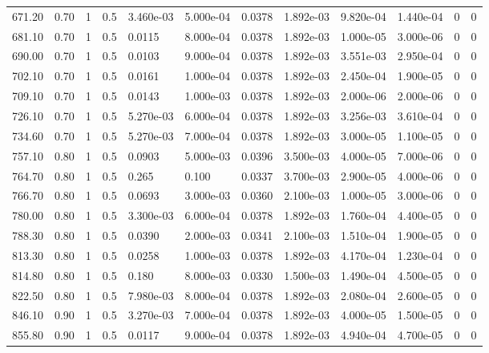 \documentclass[preview]{standalone}
\begin{document}
{{{\begin{tabular}{L{1.2cm}C{1.2cm} C{0.3cm}C{0.5cm} C{1.4cm}C{1.4cm} C{1.4cm}C{1.4cm} C{1.6cm}C{1.6cm} C{1.6cm}C{1.6cm}}
  671.20  &  0.70  & 1     & 0.5 &  3.460e-03  & 5.000e-04  &  0.0378&   1.892e-03& 9.820e-04 & 1.440e-04   &  0 & 0  \\ 
  681.10  &  0.70  & 1     & 0.5 &  0.0115  & 8.000e-04  &  0.0378&   1.892e-03& 1.000e-05 & 3.000e-06   &  0 & 0  \\ 
  690.00  &  0.70  & 1     & 0.5 &  0.0103  & 9.000e-04  &  0.0378&   1.892e-03& 3.551e-03 & 2.950e-04   &  0 & 0  \\ 
  702.10  &  0.70  & 1     & 0.5 &  0.0161  & 1.000e-04  &  0.0378&   1.892e-03& 2.450e-04 & 1.900e-05   &  0 & 0  \\ 
  709.10  &  0.70  & 1     & 0.5 &  0.0143  & 1.000e-03  &  0.0378&   1.892e-03& 2.000e-06 & 2.000e-06   &  0 & 0  \\ 
  726.10  &  0.70  & 1     & 0.5 &  5.270e-03  & 6.000e-04  &  0.0378&   1.892e-03& 3.256e-03 & 3.610e-04   &  0 & 0  \\ 
  734.60  &  0.70  & 1     & 0.5 &  5.270e-03  & 7.000e-04  &  0.0378&   1.892e-03& 3.000e-05 & 1.100e-05   &  0 & 0  \\ 
  757.10  &  0.80  & 1     & 0.5 &  0.0903  & 5.000e-03  &  0.0396&   3.500e-03& 4.000e-05 & 7.000e-06   &  0 & 0  \\ 
  764.70  &  0.80  & 1     & 0.5 &  0.265  & 0.100  &  0.0337&   3.700e-03& 2.900e-05 & 4.000e-06   &  0 & 0  \\ 
  766.70  &  0.80  & 1     & 0.5 &  0.0693  & 3.000e-03  &  0.0360&   2.100e-03& 1.000e-05 & 3.000e-06   &  0 & 0  \\ 
  780.00  &  0.80  & 1     & 0.5 &  3.300e-03  & 6.000e-04  &  0.0378&   1.892e-03& 1.760e-04 & 4.400e-05   &  0 & 0  \\ 
  788.30  &  0.80  & 1     & 0.5 &  0.0390  & 2.000e-03  &  0.0341&   2.100e-03& 1.510e-04 & 1.900e-05   &  0 & 0  \\ 
  813.30  &  0.80  & 1     & 0.5 &  0.0258  & 1.000e-03  &  0.0378&   1.892e-03& 4.170e-04 & 1.230e-04   &  0 & 0  \\ 
  814.80  &  0.80  & 1     & 0.5 &  0.180  & 8.000e-03  &  0.0330&   1.500e-03& 1.490e-04 & 4.500e-05   &  0 & 0  \\ 
  822.50  &  0.80  & 1     & 0.5 &  7.980e-03  & 8.000e-04  &  0.0378&   1.892e-03& 2.080e-04 & 2.600e-05   &  0 & 0  \\ 
  846.10  &  0.90  & 1     & 0.5 &  3.270e-03  & 7.000e-04  &  0.0378&   1.892e-03& 4.000e-05 & 1.500e-05   &  0 & 0  \\ 
  855.80  &  0.90  & 1     & 0.5 &  0.0117  & 9.000e-04  &  0.0378&   1.892e-03& 4.940e-04 & 4.700e-05   &  0 & 0  \\ 

\end{tabular}}}}
\end{document}
